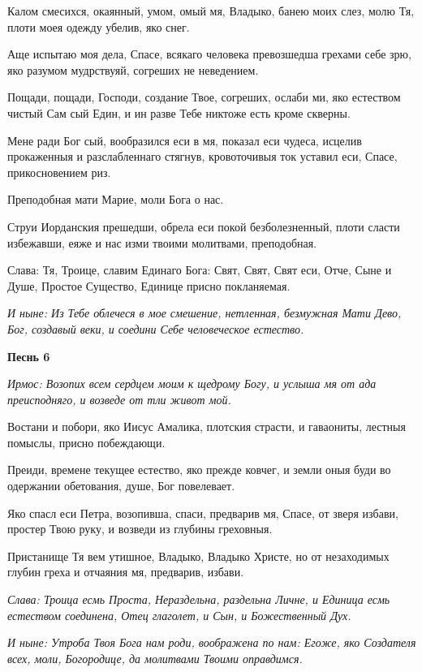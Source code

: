 Калом смесихся, окаянный, умом, омый мя, Владыко, банею моих слез, молю Тя, плоти моея одежду убелив, яко снег. 

Аще испытаю моя дела, Спасе, всякаго человека превозшедша грехами себе зрю, яко разумом мудрствуяй, согреших не неведением. 

Пощади, пощади, Господи, создание Твое, согреших, ослаби ми, яко естеством чистый Сам сый Един, и ин разве Тебе никтоже есть кроме скверны. 

Мене ради Бог сый, вообразился еси в мя, показал еси чудеса, исцелив прокаженныя и разслабленнаго стягнув, кровоточивыя ток уставил еси, Спасе, прикосновением риз. 

Преподобная мати Марие, моли Бога о нас. 

Струи Иорданския прешедши, обрела еси покой безболезненный, плоти сласти избежавши, еяже и нас изми твоими молитвами, преподобная. 

Слава: Тя, Троице, славим Единаго Бога: Свят, Свят, Свят еси, Отче, Сыне и Душе, Простое Существо, Единице присно покланяемая. 

\itshape И ныне\normalfont{}: Из Тебе облечеся в мое смешение, нетленная, безмужная Мати Дево, Бог, создавый веки, и соедини Себе человеческое естество.

\medskip\bfseries Песнь 6\normalfont{}

\itshape Ирмос\normalfont{}: Возопих всем сердцем моим к щедрому Богу, и услыша мя от ада преисподняго, и возведе от тли живот мой. 

Востани и побори, яко Иисус Амалика, плотския страсти, и гаваониты, лестныя помыслы, присно побеждающи. 

Преиди, времене текущее естество, яко прежде ковчег, и земли оныя буди во одержании обетования, душе, Бог повелевает. 

Яко спасл еси Петра, возопивша, спаси, предварив мя, Спасе, от зверя избави, простер Твою руку, и возведи из глубины греховныя. 

Пристанище Тя вем утишное, Владыко, Владыко Христе, но от незаходимых глубин греха и отчаяния мя, предварив, избави. 

\itshape Слава\normalfont{}: Троица есмь Проста, Нераздельна, раздельна Личне, и Единица есмь естеством соединена, Отец глаголет, и Сын, и Божественный Дух. 

\itshape И ныне\normalfont{}: Утроба Твоя Бога нам роди, воображена по нам: Егоже, яко Создателя всех, моли, Богородице, да молитвами Твоими оправдимся. 

